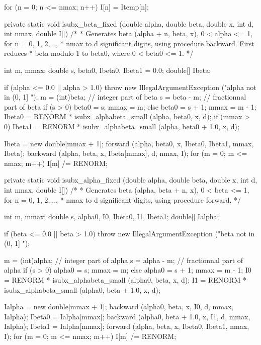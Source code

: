 \begin{code}
\begin{hide}
{      for (n = 0; n <= nmax; n++)
         I[n] = Itemp[n];
   }

   private static void isubx_beta_fixed (double alpha, double beta, double x,
                                         int d, int nmax, double I[])
   /*
    * Generates beta (alpha + n, beta, x), 0 < alpha <= 1, for n = 0, 1, 2,...,
    * nmax to d significant digits, using procedure backward. First reduces
    * beta modulo 1 to beta0, where 0 < beta0 <= 1.
    */
   {
      int m, mmax;
      double s, beta0, Ibeta0, Ibeta1 = 0.0;
      double[] Ibeta;

      if (alpha <= 0.0 || alpha > 1.0)
        throw new IllegalArgumentException ("alpha not in (0, 1] ");
      m = (int)beta;                         // integer part of beta
      s = beta - m;                     // fractionnal part of beta
      if (s > 0) {
         beta0 = s;
         mmax = m;
      }
      else {
         beta0 = s + 1;
         mmax = m - 1;
      }
      Ibeta0 = RENORM * isubx_alphabeta_small (alpha, beta0, x, d);
      if (mmax > 0)
         Ibeta1 = RENORM * isubx_alphabeta_small (alpha, beta0 + 1.0, x, d);

      Ibeta = new double[mmax + 1];
      forward (alpha, beta0, x, Ibeta0, Ibeta1, mmax, Ibeta);
      backward (alpha, beta, x, Ibeta[mmax], d, nmax, I);
      for (m = 0; m <= nmax; m++)
         I[m] /= RENORM;
   }

   private static void isubx_alpha_fixed (double alpha, double beta,
           double x, int d, int nmax, double I[])
   /*
    * Generates beta (alpha, beta + n, x), 0 < beta <= 1, for n = 0, 1, 2,...,
    * nmax to d significant digits, using procedure forward.
    */
   {
      int m, mmax;
      double s, alpha0, I0, Ibeta0, I1, Ibeta1;
      double[] Ialpha;

      if (beta <= 0.0 || beta > 1.0)
        throw new IllegalArgumentException ("beta not in (0, 1] ");

      m = (int)alpha;         // integer part of alpha
      s = alpha - m;          // fractionnal part of alpha
      if (s > 0) {
         alpha0 = s;
         mmax = m;
      }
      else {
         alpha0 = s + 1;
         mmax = m - 1;
      }
      I0 = RENORM * isubx_alphabeta_small (alpha0, beta, x, d);
      I1 = RENORM * isubx_alphabeta_small (alpha0, beta + 1.0, x, d);

      Ialpha = new double[mmax + 1];
      backward (alpha0, beta, x, I0, d, mmax, Ialpha);
      Ibeta0 = Ialpha[mmax];
      backward (alpha0, beta + 1.0, x, I1, d, mmax, Ialpha);
      Ibeta1 = Ialpha[mmax];
      forward (alpha, beta, x, Ibeta0, Ibeta1, nmax, I);
      for (m = 0; m <= nmax; m++)
         I[m] /= RENORM;
   }


\end{hide}
\end{code}
